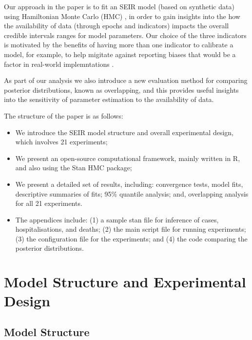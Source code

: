 \documentclass[10pt,letterpaper]{article}
\begin{document}
Our approach in the paper is to fit an SEIR model (based on synthetic data) using Hamiltonian Monte Carlo (HMC) \citep{https://doi.org/10.1002/sdr.1693}, in order to gain insights into the how the availability of data (through epochs and indicators) impacts the overall credible intervals ranges for model parameters. Our choice of the three indicators is motivated by the benefits of having more than one indicator to calibrate a model, for example, to help migitate against reporting biases that would be a factor in real-world implemntations \citep{PolicyEPI}.

As part of our analysis we also introduce a new evaluation method for comparing posterior distributions, known as overlapping, and this provides useful insights into the sensitivity of parameter estimation to the availability of data.

The structure of the paper is as follows:

\begin{itemize}
\item
  We introduce the SEIR model structure and overall experimental design, which involves 21 experiments;
\item
  We present an open-source computational framework, mainly written in R, and also using the Stan HMC package;
\item
  We present a detailed set of results, including: convergence tests, model fits, descriptive summaries of fits; 95\% quantile analysis; and, overlapping analysis for all 21 experiments.
\item
  The appendices include: (1) a sample stan file for inference of cases, hospitalisations, and deaths; (2) the main script file for running experiments; (3) the configuration file for the experiments; and (4) the code comparing the posterior distributions.
\end{itemize}

\hypertarget{model-structure-and-experimental-design}{%
\section{Model Structure and Experimental Design}\label{model-structure-and-experimental-design}}

\hypertarget{model-structure}{%
\subsection{Model Structure}\label{model-structure}}
\end{document}

